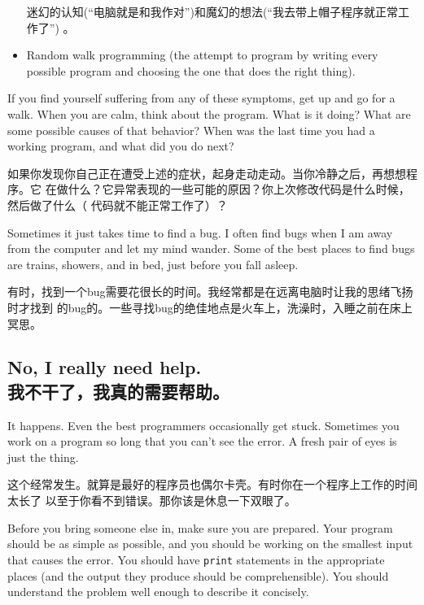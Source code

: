 \documentclass[10pt]{book}
\begin{document}
\begin{CJK}{UTF8}{gbsn}
\begin{itemize}
迷幻的认知(``电脑就是和我作对'')和魔幻的想法(``我去带上帽子程序就正常工作了'')
。

\item Random walk programming (the attempt to program by writing
every possible program and choosing the one that does the right
thing).

\end{itemize}

If you find yourself suffering from any of these symptoms, get
up and go for a walk.  When you are calm, think about the program.
What is it doing?  What are some possible causes of that
behavior?  When was the last time you had a working program,
and what did you do next?

如果你发现你自己正在遭受上述的症状，起身走动走动。当你冷静之后，再想想程序。它
在做什么？它异常表现的一些可能的原因？你上次修改代码是什么时候，然后做了什么（
代码就不能正常工作了）？

Sometimes it just takes time to find a bug.  I often find bugs
when I am away from the computer and let my mind wander.  Some
of the best places to find bugs are trains, showers, and in bed,
just before you fall asleep.

有时，找到一个bug需要花很长的时间。我经常都是在远离电脑时让我的思绪飞扬时才找到
的bug的。一些寻找bug的绝佳地点是火车上，洗澡时，入睡之前在床上冥思。

\subsection{No, I really need help.\\我不干了，我真的需要帮助。}

It happens.  Even the best programmers occasionally get stuck.
Sometimes you work on a program so long that you can't see the
error.  A fresh pair of eyes is just the thing.

这个经常发生。就算是最好的程序员也偶尔卡壳。有时你在一个程序上工作的时间太长了
以至于你看不到错误。那你该是休息一下双眼了。

Before you bring someone else in, make sure you are prepared.
Your program should be as simple
as possible, and you should be working on the smallest input
that causes the error.  You should have {\tt print} statements in the
appropriate places (and the output they produce should be
comprehensible).  You should understand the problem well enough
to describe it concisely.


\end{CJK}
\end{document}
